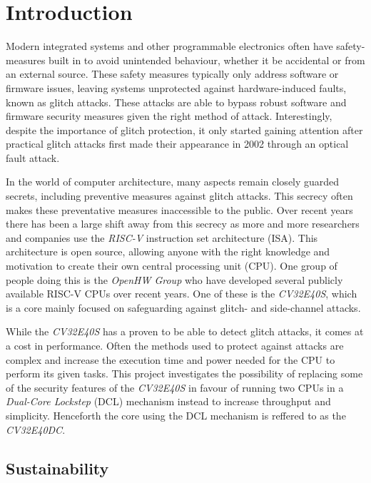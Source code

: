 \chapter{Introduction}
\label{intro} 

Modern integrated systems and other programmable electronics often have safety-measures built in to avoid unintended behaviour, whether it be accidental or from an external source. These safety measures typically only address software or firmware issues, leaving systems unprotected against hardware-induced faults, known as glitch attacks. These attacks are able to bypass robust software and firmware security measures given the right method of attack. Interestingly, despite the importance of glitch protection, it only started gaining attention after practical glitch attacks first made their appearance in 2002 through an optical fault attack\cite{trouchkine2019fault}. 

In the world of computer architecture, many aspects remain closely guarded secrets, including preventive measures against glitch attacks. This secrecy often makes these preventative measures inaccessible to the public. Over recent years there has been a large shift away from this secrecy as more and more researchers and companies use the \textit{RISC-V} instruction set architecture (ISA)\cite{riscv_manual}. This architecture is open source, allowing anyone with the right knowledge and motivation to create their own central processing unit (CPU). One group of people doing this is the \textit{OpenHW Group} who have developed several publicly available RISC-V CPUs over recent years. One of these is the \textit{CV32E40S}, which is a core mainly focused on safeguarding against glitch- and side-channel attacks\cite{cv32e40s_manual}.

While the \textit{CV32E40S} has a proven to be able to detect glitch attacks, it comes at a cost in performance. Often the methods used to protect against attacks are complex and increase the execution time and power needed for the CPU to perform its given tasks. This project investigates the possibility of replacing some of the security features of the \textit{CV32E40S} in favour of running two CPUs in a \textit{Dual-Core Lockstep} (DCL) mechanism instead to increase throughput and simplicity. Henceforth the core using the DCL mechanism is reffered to as the \textit{CV32E40DC}. 

\section{Sustainability}
\label{sec:sustainability}


